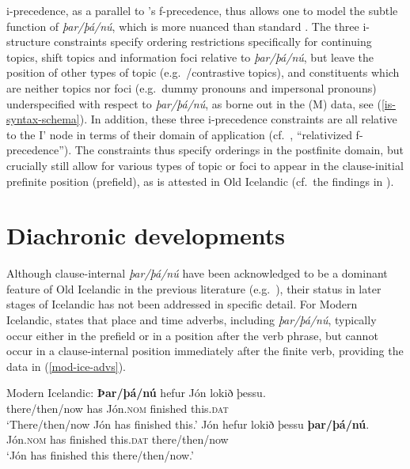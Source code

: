 \documentclass[output=paper,colorlinks,citecolor=brown]{langscibook}
\begin{document}
i-precedence, as a parallel to 's f-precedence, thus allows one to model the subtle  function of \textit{þar/þá/nú}, which is more nuanced than standard . The three i-structure constraints specify ordering restrictions specifically for continuing topics, shift topics and information foci relative to \textit{þar/þá/nú}, but leave the position of other types of topic (e.g.~/contrastive topics), and constituents which are neither topics nor foci (e.g.~dummy pronouns and impersonal pronouns) underspecified with respect to \textit{þar/þá/nú}, as borne out in the (M) data, see (\ref{is-syntax-schema}).
In addition, these three i-precedence constraints are all relative to the I' node in terms of their domain of application (cf.~\citealp{zaenen1995formal}, ``relativized f-precedence''). The constraints thus specify orderings in the postfinite domain, but crucially still allow for various types of topic or foci to appear in the clause-initial prefinite position (prefield), as is attested in Old Icelandic (cf.~the findings in \citealp{booth_revisiting_2021}).

\section{Diachronic developments}\label{sect:dia}

Although clause-internal \textit{þar/þá/nú} have been acknowledged to be a dominant feature of Old Icelandic in the previous literature (e.g.~\citealp[71]{Faarlund1990}), their status in later stages of Icelandic has not been addressed in specific detail.
For Modern Icelandic, \citet[38--39]{Thrainsson2007} states that place and time adverbs, including \textit{þar/þá/nú}, typically occur either in the prefield or in a position after the verb phrase, but cannot occur in a clause-internal position immediately after the finite verb, providing the data in (\ref{mod-ice-advs}).

\ea \label{mod-ice-advs} Modern Icelandic:
\ea
\gll \textbf{Þar/þá/nú} hefur Jón lokið þessu.\\
there/then/now has Jón.\textsc{nom} finished this.\textsc{dat}\\
\glt `There/then/now Jón has finished this.'
\ex
\gll Jón hefur lokið þessu \textbf{þar/þá/nú}.\\
Jón.\textsc{nom} has finished this.\textsc{dat} there/then/now\\
\glt `Jón has finished this there/then/now.'
 \hfill \citep[39]{Thrainsson2007}
\z 
\z 
\end{document}
